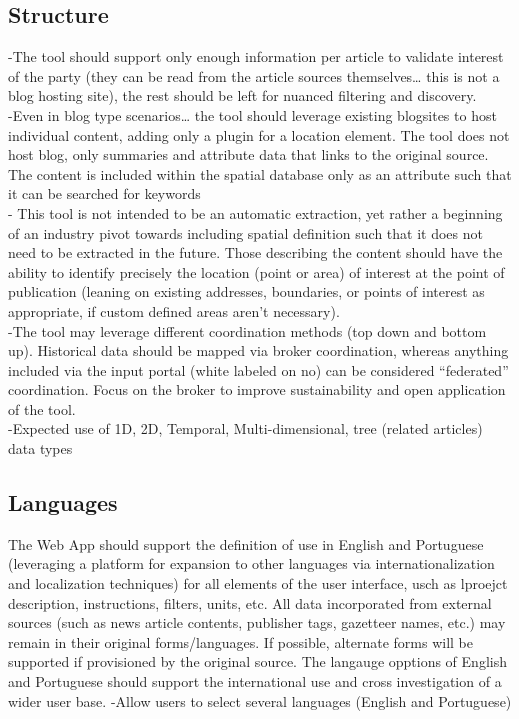 \subsection{Structure}
-{\color{purple}The tool should support only enough information per article to validate interest of the party (they can be read from the article sources themselves… this is not a blog hosting site), the rest should be left for nuanced filtering and discovery.\cite{Jiang2020}}\\
-{\color{purple}Even in blog type scenarios… the tool should leverage existing blogsites to host individual content, adding only a plugin for a location element.  The tool does not host blog, only summaries and attribute data that links to the original source. The content is included within the spatial database only as an attribute such that it can be searched for keywords}\cite{Afzalan2017}\\
-{\color{purple} This tool is not intended to be an automatic extraction, yet rather a beginning of an industry pivot towards including spatial definition such that it does not need to be extracted in the future.  Those describing the content should have the ability to identify precisely the location (point or area) of interest at the point of publication (leaning on existing addresses, boundaries, or points of interest as appropriate, if custom defined areas aren’t necessary).}\cite{Bhattacharya2018}\\
-{\color{purple}The tool may leverage different coordination methods (top down and bottom up).  Historical data should be mapped via broker coordination, whereas anything included via the input portal (white labeled on no) can be considered “federated” coordination.  Focus on the broker to improve sustainability and open application of the tool. \cite{Jiang2020}}\\
-{\color{purple}Expected use of 1D, 2D, Temporal, Multi-dimensional, tree (related articles) data types\cite{Shneiderman1996}}\\

\subsection{Languages}
The Web App should support the definition of use in English and Portuguese (leveraging a platform for expansion to other languages via internationalization and localization techniques) for all elements of the user interface, usch as lproejct description, instructions, filters, units, etc. All data incorporated from external sources (such as news article contents, publisher tags, gazetteer names, etc.) may remain in their original forms/languages. If possible, alternate forms will be supported if provisioned by the original source. The langauge opptions of English and Portuguese should support the international use and cross investigation of a wider user base.
-{\color{purple}Allow users to select several languages (English and Portuguese)\cite{Shneiderman2020}}\\

